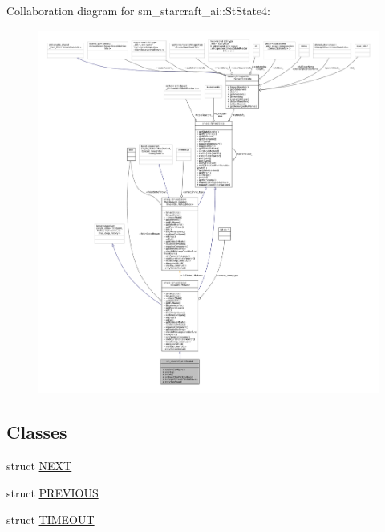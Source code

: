 Collaboration diagram for sm\+\_\+starcraft\+\_\+ai\+:\+:St\+State4\+:
\nopagebreak
\begin{figure}[H]
\begin{center}
\leavevmode
\includegraphics[width=350pt]{structsm__starcraft__ai_1_1StState4__coll__graph}
\end{center}
\end{figure}
\subsection*{Classes}
\begin{DoxyCompactItemize}
\item 
struct \hyperlink{structsm__starcraft__ai_1_1StState4_1_1NEXT}{N\+E\+XT}
\item 
struct \hyperlink{structsm__starcraft__ai_1_1StState4_1_1PREVIOUS}{P\+R\+E\+V\+I\+O\+US}
\item 
struct \hyperlink{structsm__starcraft__ai_1_1StState4_1_1TIMEOUT}{T\+I\+M\+E\+O\+UT}
\end{DoxyCompactItemize}
